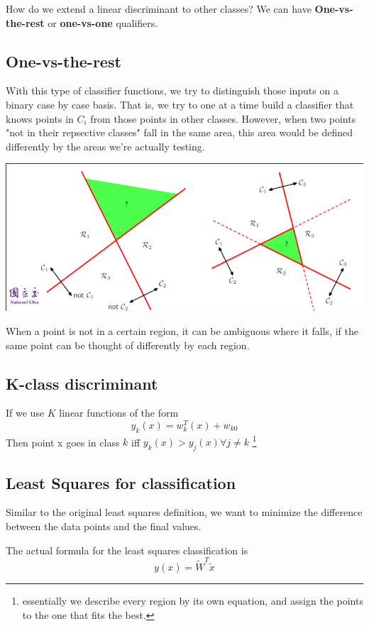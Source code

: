 \documentclass{tufte-handout}
\begin{document}
How do we extend a linear discriminant to other classes? We can have
\textbf{One-vs-the-rest} or \textbf{one-vs-one} qualifiers.
\subsection{One-vs-the-rest}
	With this type of classifier functions, we try to distinguish those
	inputs on a binary case by case basis. That is, we try to one at a time
	build a classifier that knows points in $C_{i}$ from those points in other
	classes. However, when two points  "not in their repsective classes" fall
	in the same area, this area would be defined differently by the areas we're 
	actually testing.
	\begin{marginfigure}
		\includegraphics[width=\linewidth]{ambiguous}
		\caption{When a point is not in a certain region, it can 
			be ambiguous where it falls, if the same point can be thought
			of differently by each region.}
	\end{marginfigure}
\subsection{K-class discriminant}
	If we use $K$ linear functions of the form 
	\[ y_{k}(x) = w^{T}_{k}(x) + w_{k0}\]
	Then point x goes in class $k$ iff $y_{k}(x) > y_{j}(x) \forall j\neq k$ 
	\footnote{essentially we describe every region by its own equation, and assign
		the points to the one that fits the best.}
\subsection{Least Squares for classification}
	Similar to the original least squares definition, we want to minimize the difference
	between the data points and the final values. 

	The actual formula for the least squares classification is
	\[ y(x) = \widetilde{W}^{T}\tilde{x}\]
\end{document}
